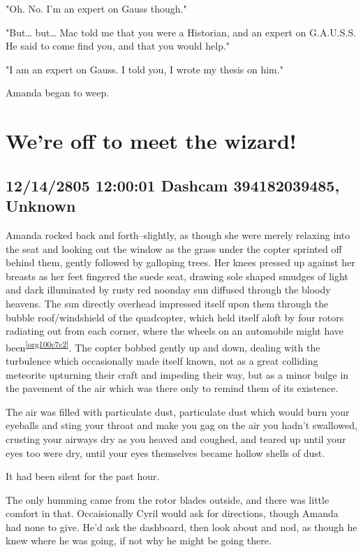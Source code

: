 \documentclass[12pt]{article}
\begin{document}
"Oh. No. I'm an expert on Gauss though."

"But\ldots{} but\ldots{} Mac told me that you were a Historian, and an expert on G.A.U.S.S. He said to come find you, and that you would help."

"I am an expert on Gauss. I told you, I wrote my thesis on him."

Amanda began to weep.

\section*{We're off to meet the wizard!}
\label{sec:org4d3e9b3}
\subsection*{12/14/2805 12:00:01 Dashcam 394182039485, Unknown}
\label{sec:orgb12e773}
Amanda rocked back and forth--slightly, as though she were merely relaxing into the seat and looking out the window as the grass under the copter sprinted off behind them, gently followed by galloping trees. Her knees pressed up against her breasts as her feet fingered the suede seat, drawing sole shaped smudges of light and dark illuminated by rusty red noonday sun diffused through the bloody heavens. The sun directly overhead impressed itself upon them through the bubble roof/windshield of the quadcopter, which held itself aloft by four rotors radiating out from each corner, where the wheels on an automobile might have been\textsuperscript{\ref{org100c7c2}}. The copter bobbed gently up and down, dealing with the turbulence which occasionally made itself known, not as a great colliding meteorite upturning their craft and impeding their way, but as a minor bulge in the pavement of the air which was there only to remind them of its existence.

The air was filled with particulate dust, particulate dust which would burn your eyeballs and sting your throat and make you gag on the air you hadn't swallowed, crusting your airways dry as you heaved and coughed, and teared up until your eyes too were dry, until your eyes themselves became hollow shells of dust.

It had been silent for the past hour.

The only humming came from the rotor blades outside, and there was little comfort in that. Occaisionally Cyril would ask for directions, though Amanda had none to give. He'd ask the dashboard, then look about and nod, as though he knew where he was going, if not why he might be going there.
\end{document}
